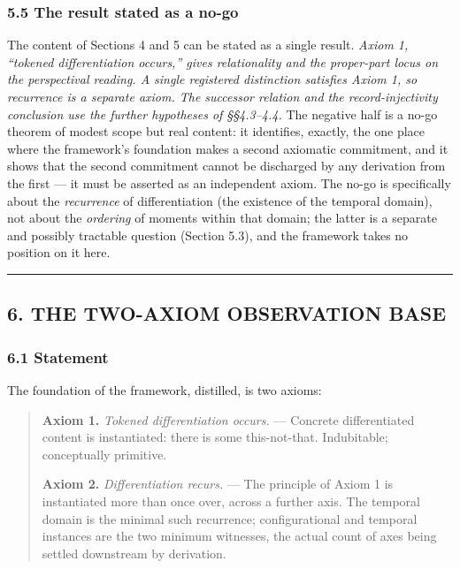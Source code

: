 \documentclass[
]{article}
\begin{document}
\hypertarget{the-result-stated-as-a-no-go}{%
\subsubsection{5.5 The result stated as a
no-go}\label{the-result-stated-as-a-no-go}}

The content of Sections 4 and 5 can be stated as a single result.
\emph{Axiom 1, ``tokened differentiation occurs,'' gives relationality
and the proper-part locus on the perspectival reading. A single
registered distinction satisfies Axiom 1, so recurrence is a separate
axiom. The successor relation and the record-injectivity conclusion use
the further hypotheses of §§4.3--4.4.} The negative half is a no-go
theorem of modest scope but real content: it identifies, exactly, the
one place where the framework's foundation makes a second axiomatic
commitment, and it shows that the second commitment cannot be discharged
by any derivation from the first --- it must be asserted as an
independent axiom. The no-go is specifically about the \emph{recurrence}
of differentiation (the existence of the temporal domain), not about the
\emph{ordering} of moments within that domain; the latter is a separate
and possibly tractable question (Section 5.3), and the framework takes
no position on it here.

\begin{center}\rule{0.5\linewidth}{0.5pt}\end{center}

\hypertarget{the-two-axiom-observation-base}{%
\subsection{6. THE TWO-AXIOM OBSERVATION
BASE}\label{the-two-axiom-observation-base}}

\hypertarget{statement}{%
\subsubsection{6.1 Statement}\label{statement}}

The foundation of the framework, distilled, is two axioms:

\begin{quote}
\textbf{Axiom 1.} \emph{Tokened differentiation occurs.} --- Concrete
differentiated content is instantiated: there is some this-not-that.
Indubitable; conceptually primitive.

\textbf{Axiom 2.} \emph{Differentiation recurs.} --- The principle of
Axiom 1 is instantiated more than once over, across a further axis. The
temporal domain is the minimal such recurrence; configurational and
temporal instances are the two minimum witnesses, the actual count of
axes being settled downstream by derivation.
\end{quote}
\end{document}
